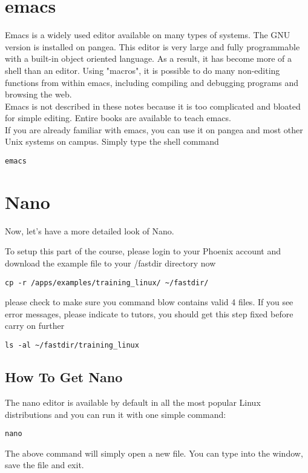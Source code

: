 \section{emacs}

\begin{information}
Emacs is a widely used editor available on many types of systems. The GNU version is installed on
pangea. This editor is very large and fully programmable with a built-in object oriented language.
As a result, it has become more of a shell than an editor. Using "macros", it is possible to do many
non-editing functions from within emacs, including compiling and debugging programs and browsing the
web. \\

Emacs is not described in these notes because it is too complicated and bloated for simple editing.
Entire books are available to teach emacs. \\

If you are already familiar with emacs, you can use it on pangea and most other Unix systems on
campus. Simply type the shell command
\begin{lstlisting}
emacs
\end{lstlisting}
\end{information}

\section{Nano}

Now, let's have a more detailed look of Nano. \\

\begin{warning}
To setup this part of the course, please login to your Phoenix account and download the example file
to your /fastdir directory now
\begin{lstlisting}
cp -r /apps/examples/training_linux/ ~/fastdir/
\end{lstlisting}
please check to make sure you command blow contains valid 4 files. If you see error messages, please
indicate to tutors, 
you should get this step fixed before carry on further
\begin{lstlisting}
ls -al ~/fastdir/training_linux
\end{lstlisting}
\end{warning}

\subsection{How To Get Nano}
The nano editor is available by default in all the most popular Linux distributions and you can run
it with one simple command:
\begin{lstlisting}
nano 
\end{lstlisting}
The above command will simply open a new file. You can type into the window, save the file and exit.

